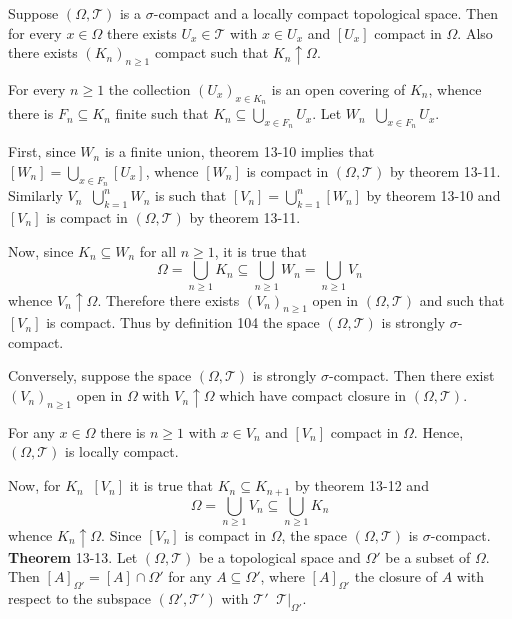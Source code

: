 \documentclass[a4paper]{article}
\newcommand{\clo}[1]{\left [ #1 \right ]}
\newcommand{\brac}[1]{\left ( #1 \right )}
\newcommand{\induc}[1]{\left . #1 \right \vert}
\newcommand{\Tcal}{\mathcal{T}}
\newcommand{\defn}{\mathop{\overset{\Delta}{=}}\nolimits}
\begin{document}
Suppose $\brac{\Omega,\Tcal}$ is a $\sigma$-compact and a locally compact topological space. Then for every $x\in \Omega$ there exists $U_x\in \Tcal$ with $x\in U_x$ and $\clo{U_x}$ compact in $\Omega$. Also there exists $\brac{K_n}_{n\geq1}$ compact such that $K_n\uparrow \Omega$.

For every $n\geq1$ the collection $\brac{U_x}_{x\in K_n}$ is an open covering of $K_n$, whence there is $F_n\subseteq K_n$ finite such that $K_n\subseteq \bigcup_{x\in F_n} U_x$. Let $W_n\defn \bigcup_{x\in F_n} U_x$.

First, since $W_n$ is a finite union, theorem 13-10 implies that $\clo{W_n}=\bigcup_{x\in F_n} \clo{U_x}$, whence $\clo{W_n}$ is compact in $\brac{\Omega,\Tcal}$ by theorem 13-11. Similarly $V_n\defn \bigcup_{k=1}^n W_n$ is such that $\clo{V_n} = \bigcup_{k=1}^n \clo{W_n}$ by theorem 13-10 and $\clo{V_n}$ is compact in $\brac{\Omega,\Tcal}$ by theorem 13-11.

Now, since $K_n\subseteq W_n$ for all $n\geq1$, it is true that \[\Omega = \bigcup_{n\geq1} K_n \subseteq \bigcup_{n\geq1}W_n = \bigcup_{n\geq1}V_n\] whence $V_n\uparrow \Omega$. Therefore there exists $\brac{V_n}_{n\geq1}$ open in $\brac{\Omega,\Tcal}$ and such that $\clo{V_n}$ is compact. Thus by definition 104 the space $\brac{\Omega, \Tcal}$ is strongly $\sigma$-compact.

Conversely, suppose the space $\brac{\Omega, \Tcal}$ is strongly $\sigma$-compact. Then there exist $\brac{V_n}_{n\geq1}$ open in $\Omega$ with $V_n\uparrow \Omega$ which have compact closure in $\brac{\Omega, \Tcal}$.

For any $x\in \Omega$ there is $n\geq1$ with $x\in V_n$ and $\clo{V_n}$ compact in $\Omega$. Hence, $\brac{\Omega,\Tcal}$ is locally compact.

Now, for $K_n\defn \clo{V_n}$ it is true that $K_n\subseteq K_{n+1}$ by theorem 13-12 and \[\Omega = \bigcup_{n\geq1} V_n \subseteq \bigcup_{n\geq1} K_n\] whence $K_n\uparrow \Omega$. Since $\clo{V_n}$ is compact in $\Omega$, the space $\brac{\Omega,\Tcal}$ is $\sigma$-compact.\\

\label{thm:subspace_closure} \noindent \textbf{Theorem} 13-13.
Let $\brac{\Omega, \Tcal}$ be a topological space and $\Omega'$ be a subset of $\Omega$. Then $\clo{A}_{\Omega'} = \clo{A}\cap \Omega'$ for any $A\subseteq \Omega'$, where $\clo{A}_{\Omega'}$ the closure of $A$ with respect to the subspace $\brac{\Omega',\Tcal'}$ with $\Tcal'\defn \induc{\Tcal}_{\Omega'}$.
\end{document}
